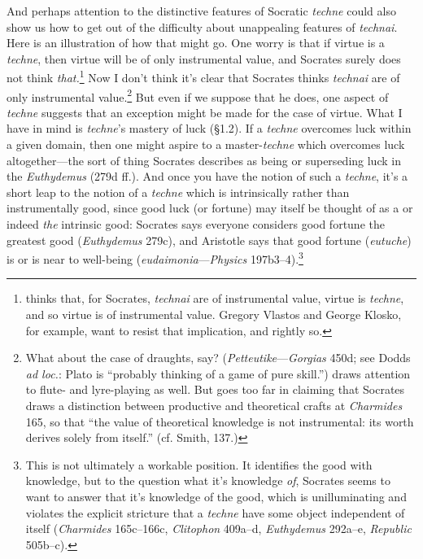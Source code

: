﻿\documentclass[11pt]{amsart}
\begin{document}
And perhaps attention to the distinctive features of Socratic \emph{techne} could also show us how to get out of the difficulty about unappealing features of \emph{technai}. Here is an illustration of how that might go. One worry is that if virtue is a \emph{techne}, then virtue will be of only instrumental value, and Socrates surely does not think \emph{that.}\footnote{\citet[198--9]{irwin1995pse} thinks that, for Socrates, \emph{technai} are of instrumental value, virtue is \emph{techne}, and so virtue is of instrumental value. Gregory Vlastos and George Klosko, for example, want to resist that implication, and rightly so.} Now I don't think it's clear that Socrates thinks \emph{technai} are of only instrumental value.\footnote{What about the case of draughts, say? (\emph{Petteutike}---\emph{Gorgias} 450d; see Dodds \emph{ad loc.}: Plato is ``probably thinking of a game of pure skill.'') \citet[100]{gosling1978pmt} draws attention to flute- and lyre-playing as well. But \citet[187--8]{roochnik1986} goes too far in claiming that Socrates draws a distinction between productive and theoretical crafts at \emph{Charmides} 165, so that ``the value of theoretical knowledge is not instrumental: its worth derives solely from itself.'' (cf. Smith, 137.)} But even if we suppose that he does, one aspect of \emph{techne} suggests that an exception might be made for the case of virtue. What I have in mind is \emph{techne}'s mastery of luck (\S1.2). If a \emph{techne} overcomes luck within a given domain, then one might aspire to a master-\emph{techne} which overcomes luck altogether---the sort of thing Socrates describes as being or superseding luck in the \emph{Euthydemus} (279d ff.). And once you have the notion of such a \emph{techne}, it's a short leap to the notion of a \emph{techne} which is intrinsically rather than instrumentally good, since good luck (or fortune) may itself be thought of as a or indeed \emph{the} intrinsic good: Socrates says everyone considers good fortune the greatest good (\emph{Euthydemus} 279c), and Aristotle says that good fortune (\emph{eutuche}) is or is near to well-being (\emph{eudaimonia}---\emph{Physics} 197b3--4).\footnote{This is not ultimately a workable position. It identifies the good with knowledge, but to the question what it's knowledge \emph{of}, Socrates seems to want to answer that it's knowledge of the good, which is unilluminating and violates the explicit stricture that a \emph{techne} have some object independent of itself (\emph{Charmides} 165c--166c, \emph{Clitophon} 409a--d, \emph{Euthydemus} 292a--e, \emph{Republic} 505b--c).}
\end{document}
